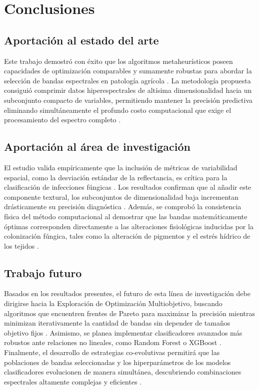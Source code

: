 \chapter{Conclusiones}

\section{Aportación al estado del arte}
Este trabajo demostró con éxito que los algoritmos metaheurísticos poseen capacidades de optimización comparables y sumamente robustas para abordar la selección de bandas espectrales en patología agrícola \cite{sawant_survey_2020}. La metodología propuesta consiguió comprimir datos hiperespectrales de altísima dimensionalidad hacia un subconjunto compacto de variables, permitiendo mantener la precisión predictiva eliminando simultáneamente el profundo costo computacional que exige el procesamiento del espectro completo \cite{sawant_survey_2020}.

\section{Aportación al área de investigación}
El estudio valida empíricamente que la inclusión de métricas de variabilidad espacial, como la desviación estándar de la reflectancia, es crítica para la clasificación de infecciones fúngicas \cite{nagasubramanian_hyperspectral_2018}. Los resultados confirman que al añadir este componente textural, los subconjuntos de dimensionalidad baja incrementan drásticamente su precisión diagnóstica \cite{nagasubramanian_hyperspectral_2018}. Además, se comprobó la consistencia física del método computacional al demostrar que las bandas matemáticamente óptimas corresponden directamente a las alteraciones fisiológicas inducidas por la colonización fúngica, tales como la alteración de pigmentos y el estrés hídrico de los tejidos \cite{mahlein_plant_2016, nicolai_nondestructive_2007}.

\section{Trabajo futuro}
Basados en los resultados presentes, el futuro de esta línea de investigación debe dirigirse hacia la Exploración de Optimización Multiobjetivo, buscando algoritmos que encuentren frentes de Pareto para maximizar la precisión mientras minimizan iterativamente la cantidad de bandas sin depender de tamaños objetivo fijos \cite{deb_multi-objective_2001}. Asimismo, se planea implementar clasificadores avanzados más robustos ante relaciones no lineales, como Random Forest o XGBoost \cite{nagasubramanian_hyperspectral_2018}. Finalmente, el desarrollo de estrategias co-evolutivas permitirá que las poblaciones de bandas seleccionadas y los hiperparámetros de los modelos clasificadores evolucionen de manera simultánea, descubriendo combinaciones espectrales altamente complejas y eficientes \cite{deb_multi-objective_2001}.
